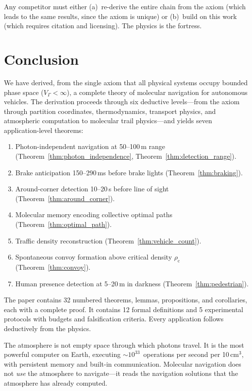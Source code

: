 \documentclass[11pt,twocolumn,a4paper]{article}
\theoremstyle{plain}
\theoremstyle{definition}
\theoremstyle{remark}
\newcommand{\VGamma}{V_{\Gamma}}
\newcommand{\rhoc}{\rho_{\mathrm{c}}}
\begin{document}
Any competitor must either (a)~re-derive the entire chain from the axiom (which leads to the same results, since the axiom is unique) or (b)~build on this work (which requires citation and licensing). The physics is the fortress.


\section{Conclusion}
\label{sec:conclusion}

We have derived, from the single axiom that all physical systems occupy bounded phase space ($\VGamma < \infty$), a complete theory of molecular navigation for autonomous vehicles. The derivation proceeds through six deductive levels---from the axiom through partition coordinates, thermodynamics, transport physics, and atmospheric computation to molecular trail physics---and yields seven application-level theorems:

\begin{enumerate}[nosep]
    \item Photon-independent navigation at 50--100\,m range (Theorem~\ref{thm:photon_independence}, Theorem~\ref{thm:detection_range}).
    \item Brake anticipation 150--290\,ms before brake lights (Theorem~\ref{thm:braking}).
    \item Around-corner detection 10--20\,s before line of sight (Theorem~\ref{thm:around_corner}).
    \item Molecular memory encoding collective optimal paths (Theorem~\ref{thm:optimal_path}).
    \item Traffic density reconstruction (Theorem~\ref{thm:vehicle_count}).
    \item Spontaneous convoy formation above critical density $\rhoc$ (Theorem~\ref{thm:convoy}).
    \item Human presence detection at 5--20\,m in darkness (Theorem~\ref{thm:pedestrian}).
\end{enumerate}

The paper contains 32 numbered theorems, lemmas, propositions, and corollaries, each with a complete proof. It contains 12 formal definitions and 5 experimental protocols with budgets and falsification criteria. Every application follows deductively from the physics.

The atmosphere is not empty space through which photons travel. It is the most powerful computer on Earth, executing $\sim 10^{33}$~operations per second per 10\,cm$^3$, with persistent memory and built-in communication. Molecular navigation does not \emph{use} the atmosphere to navigate---it reads the navigation solutions that the atmosphere has already computed.
\end{document}
